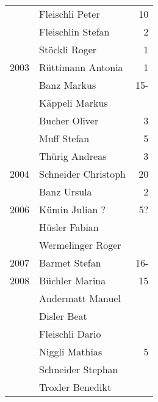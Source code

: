 {\begin{longtable}{ l l r }
                      & Fleischli Peter                           & 10          \\
                      & Fleischlin Stefan                         & 2           \\
                      & Stöckli Roger                             & 1           \\
        2003          & Rüttimann Antonia                         & 1           \\
                      & Banz Markus                               & 15-         \\
                      & Käppeli Markus                            &             \\
                      & Bucher Oliver                             & 3           \\
                      & Muff Stefan                               & 5           \\
                      & Thürig Andreas                            & 3           \\
        2004          & Schneider Christoph                       & 20          \\
                      & Banz Ursula                               & 2           \\
        2006          & Kümin Julian ?                            & 5?          \\
                      & Hüsler Fabian                             &             \\
                      & Wermelinger Roger                         &             \\
        2007          & Barmet Stefan                             & 16-         \\
        2008          & Büchler Marina                            & 15          \\
                      & Andermatt Manuel                          &             \\
                      & Disler Beat                               &             \\
                      & Fleischli Dario                           &             \\
                      & Niggli Mathias                            & 5           \\
                      & Schneider Stephan                         &             \\
                      & Troxler Benedikt                          &             \\

\end{longtable}}
